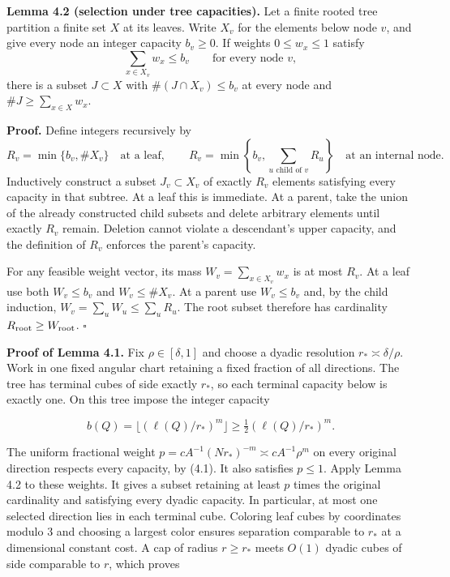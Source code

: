 \documentclass[
  11pt,
  a4paper,
]{article}
\begin{document}
\textbf{Lemma 4.2 (selection under tree capacities).} Let a finite
rooted tree partition a finite set \(X\) at its leaves. Write \(X_v\)
for the elements below node \(v\), and give every node an integer
capacity \(b_v\ge0\). If weights \(0\le w_x\le1\) satisfy
\[\sum_{x\in X_v}w_x\le b_v\qquad\text{for every node }v,\] there is a
subset \(J\subset X\) with \(\#(J\cap X_v)\le b_v\) at every node and
\(\#J\ge\sum_{x\in X}w_x\).

\textbf{Proof.} Define integers recursively by
\[R_v=\min\{b_v,\#X_v\}\quad\text{at a leaf},\qquad
 R_v=\min\left\{b_v,\sum_{u\text{ child of }v}R_u\right\}
 \quad\text{at an internal node}.\] Inductively construct a subset
\(J_v\subset X_v\) of exactly \(R_v\) elements satisfying every capacity
in that subtree. At a leaf this is immediate. At a parent, take the
union of the already constructed child subsets and delete arbitrary
elements until exactly \(R_v\) remain. Deletion cannot violate a
descendant's upper capacity, and the definition of \(R_v\) enforces the
parent's capacity.

For any feasible weight vector, its mass \(W_v=\sum_{x\in X_v}w_x\) is
at most \(R_v\). At a leaf use both \(W_v\le b_v\) and \(W_v\le\#X_v\).
At a parent use \(W_v\le b_v\) and, by the child induction,
\(W_v=\sum_uW_u\le\sum_uR_u\). The root subset therefore has cardinality
\(R_{\rm root}\ge W_{\rm root}\). \(\square\)

\textbf{Proof of Lemma 4.1.} Fix \(\rho\in[\delta,1]\) and choose a
dyadic resolution \(r_*\asymp\delta/\rho\). Work in one fixed angular
chart retaining a fixed fraction of all directions. The tree has
terminal cubes of side exactly \(r_*\), so each terminal capacity below
is exactly one. On this tree impose the integer capacity

\[b(Q)=\lfloor(\ell(Q)/r_*)^m\rfloor
 \ge\tfrac12(\ell(Q)/r_*)^m.
\tag{4.24}\label{eq:4.24}\]

The uniform fractional weight
\(p=cA^{-1}(Nr_*)^{-m}\asymp cA^{-1}\rho^m\) on every original direction
respects every capacity, by (4.1). It also satisfies \(p\le1\). Apply
Lemma 4.2 to these weights. It gives a subset retaining at least \(p\)
times the original cardinality and satisfying every dyadic capacity. In
particular, at most one selected direction lies in each terminal cube.
Coloring leaf cubes by coordinates modulo 3 and choosing a largest color
ensures separation comparable to \(r_*\) at a dimensional constant cost.
A cap of radius \(r\ge r_*\) meets \(O(1)\) dyadic cubes of side
comparable to \(r\), which proves
\end{document}
